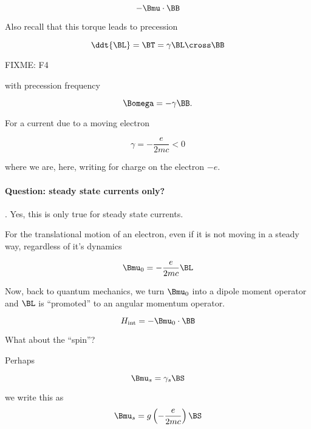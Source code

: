 \begin{equation}\label{eqn:qmTwoL15:210}
-\Bmu \cdot \BB
\end{equation}

Also recall that this torque leads to precession 

\begin{equation}\label{eqn:qmTwoL15:230}
\ddt{\BL} = \BT = \gamma \BL \cross \BB
\end{equation}

FIXME: F4

with precession frequency 

\begin{equation}\label{eqn:qmTwoL15:250}
\Bomega = - \gamma \BB.
\end{equation}

For a current due to a moving electron

\begin{equation}\label{eqn:qmTwoL15:270}
\gamma = -\frac{e}{2 m c} < 0
\end{equation}

where we are, here, writing for charge on the electron $-e$.  

\paragraph{Question: steady state currents only?}.  Yes, this is only true for steady state currents.

For the translational motion of an electron, even if it is not moving in a steady way, regardless of it's dynamics

\begin{equation}\label{eqn:qmTwoL15:290}
\Bmu_0 = - \frac{e}{2 m c} \BL
\end{equation}

Now, back to quantum mechanics, we turn $\Bmu_0$ into a dipole moment operator and $\BL$ is ``promoted'' to an angular momentum operator.

\begin{equation}\label{eqn:qmTwoL15:310}
H_{\text{int}} = - \Bmu_0 \cdot \BB
\end{equation}

What about the ``spin''?

Perhaps 

\begin{equation}\label{eqn:qmTwoL15:330}
\Bmu_s = \gamma_s \BS
\end{equation}

we write this as 
\begin{equation}\label{eqn:qmTwoL15:350}
\Bmu_s = g \left( -\frac{e}{ 2 m c} \right)\BS
\end{equation}

